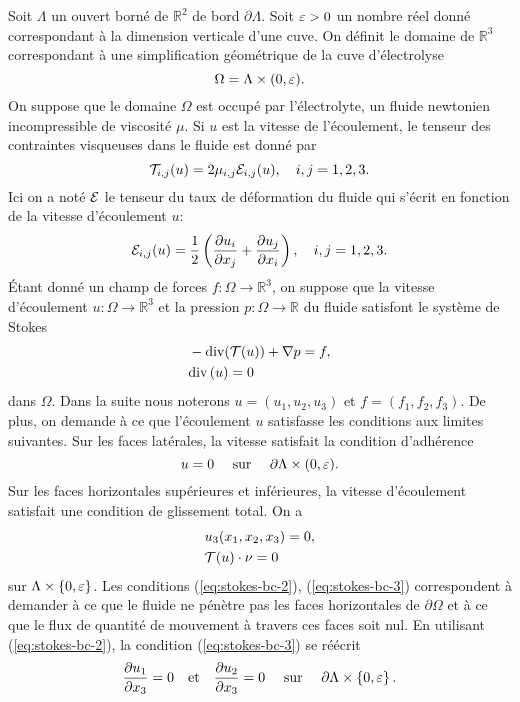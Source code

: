 Soit $\Lambda$ un ouvert borné de $\mathbb R^2$ de bord
$\partial\Lambda$. Soit $\varepsilon > 0$ un nombre réel donné
correspondant à la dimension verticale d'une cuve. On définit le
domaine de $\mathbb R^3$ correspondant à une simplification
géométrique de la cuve d'électrolyse
\begin{equation}\label{eq:domain}
  \Omega = \Lambda \times (0,\varepsilon).
\end{equation}
On suppose que le domaine $\Omega$ est occupé par l'électrolyte, un
fluide newtonien incompressible de viscosité $\mu$. Si $u$ est la
vitesse de l'écoulement, le tenseur des contraintes visqueuses dans le
fluide \cite{Landau1987} est donné par
\begin{equation}
  \mathcal T_{i,j}(u) = 2\mu_{i,j}
  \mathcal E_{i,j}(u),\quad i,j = 1,2,3.
\end{equation}
Ici on a noté $\mathcal E$ le tenseur du taux de déformation du
fluide qui s'écrit en fonction de la vitesse d'écoulement $u$:
\begin{equation}
  \mathcal E_{i,j}(u) = \frac{1}{2}\left( \frac{\partial u_i}{\partial x_j} + \frac{\partial u_j}{\partial x_i} \right),\quad i,j = 1,2,3.
\end{equation}
Étant donné un champ de forces $f:\Omega\to \mathbb R^3$, on suppose
que la vitesse d'écoulement $u:\Omega \to \mathbb R^3$ et la pression
$p:\Omega \to \mathbb R$ du fluide satisfont le système de Stokes
\begin{align}
  &- \mathrm{div}(\mathcal T(u)) + \nabla p = f,\label{eq:stokes-u}\\
  &\mathrm{div} \left( u \right) = 0\label{eq:stokes-p}
\end{align}
dans $\Omega$. Dans la suite nous noterons $u = (u_1, u_2, u_3)$ et $f =
(f_1, f_2, f_3)$. De plus, on demande à ce que l'écoulement $u$ satisfasse
les conditions aux limites suivantes. Sur les faces latérales, la
vitesse satisfait la condition d'adhérence
\begin{equation}
  u = 0\quad \text{ sur } \quad\partial \Lambda\times(0,\varepsilon).\label{eq:stokes-bc-1}
\end{equation}
Sur les faces horizontales supérieures et inférieures, la vitesse
d'écoulement satisfait une condition de glissement total. On a
\begin{align}
  &u_3(x_1, x_2, x_3) = 0,\label{eq:stokes-bc-2}\\
  &\mathcal T(u)\cdot \nu = 0\label{eq:stokes-bc-3}
\end{align}
sur $\Lambda \times\left\{ 0,\varepsilon \right\}$.
Les conditions (\ref{eq:stokes-bc-2}), (\ref{eq:stokes-bc-3})
correspondent à demander à ce que le fluide ne pénètre pas les faces
horizontales de $\partial\Omega$ et à ce que le flux de quantité de
mouvement à travers ces faces soit nul. En utilisant
(\ref{eq:stokes-bc-2}), la condition (\ref{eq:stokes-bc-3}) se réécrit
\begin{equation}
\frac{\partial u_1}{\partial x_3}
  = 0 \quad \text{et} \quad \frac{\partial u_2}{\partial x_3}
  = 0\quad \text{ sur }\quad\partial \Lambda \times\left\{ 0,\varepsilon \right\}.
\end{equation}

